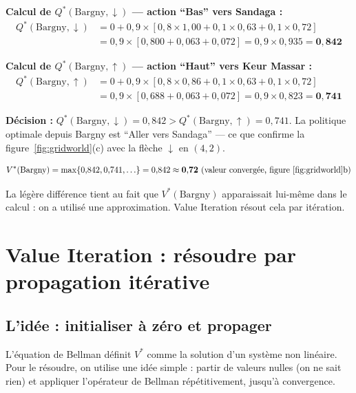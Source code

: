 \documentclass[11pt,a4paper]{article}
\begin{document}
\textbf{Calcul de $Q^*(\text{Bargny}, \downarrow)$ --- action ``Bas'' vers Sandaga :}
\begin{align*}
Q^*(\text{Bargny}, \downarrow) &= 0 + 0{,}9 \times [0{,}8 \times 1{,}00 + 0{,}1 \times 0{,}63 + 0{,}1 \times 0{,}72] \\
&= 0{,}9 \times [0{,}800 + 0{,}063 + 0{,}072] = 0{,}9 \times 0{,}935 = \mathbf{0{,}842}
\end{align*}

\textbf{Calcul de $Q^*(\text{Bargny}, \uparrow)$ --- action ``Haut'' vers Keur Massar :}
\begin{align*}
Q^*(\text{Bargny}, \uparrow) &= 0 + 0{,}9 \times [0{,}8 \times 0{,}86 + 0{,}1 \times 0{,}63 + 0{,}1 \times 0{,}72] \\
&= 0{,}9 \times [0{,}688 + 0{,}063 + 0{,}072] = 0{,}9 \times 0{,}823 = \mathbf{0{,}741}
\end{align*}

\textbf{Décision :} $Q^*(\text{Bargny}, \downarrow) = 0{,}842 > Q^*(\text{Bargny}, \uparrow) = 0{,}741$. La politique optimale depuis Bargny est ``Aller vers Sandaga'' --- ce que confirme la figure~\ref{fig:gridworld}(c) avec la flèche $\downarrow$ en $(4,2)$.

$$V^*(\text{Bargny}) = \max\{0{,}842, 0{,}741, \ldots\} = 0{,}842 \approx \mathbf{0{,}72} \text{ (valeur convergée, figure \ref{fig:gridworld}b)}$$

La légère différence tient au fait que $V^*(\text{Bargny})$ apparaissait lui-même dans le calcul : on a utilisé une approximation. Value Iteration résout cela par itération.

\section{Value Iteration : résoudre par propagation itérative}

\subsection{L'idée : initialiser à zéro et propager}

L'équation de Bellman définit $V^*$ comme la solution d'un système non linéaire. Pour le résoudre, on utilise une idée simple : partir de valeurs nulles (on ne sait rien) et appliquer l'opérateur de Bellman répétitivement, jusqu'à convergence.
\end{document}
